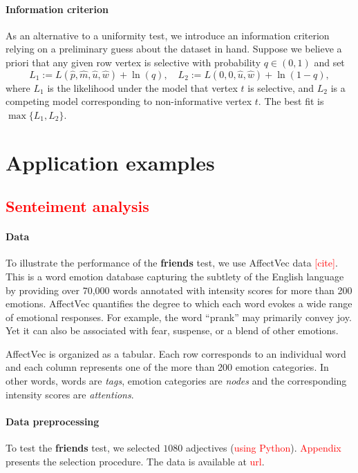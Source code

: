 \documentclass{llncs}
\newcommand{\red}[1]{\textcolor{red}{#1}}
\begin{document}
\paragraph{Information criterion}
As an alternative to a uniformity test, we introduce an information criterion relying on a preliminary guess about the dataset in hand. Suppose we believe a priori that any given row vertex is selective with probability $q\in (0, 1)$ and set
\[
L_1 := L(\hat{p}, \hat{m}, \hat{u}, \hat{w}) + \ln(q),
\quad
L_2 := L(0, 0, \hat{u}, \hat{w}) + \ln(1-q),
\]
where $L_1$ is the likelihood under the model that vertex $t$ is selective, and $L_2$ is a competing model corresponding to non-informative vertex $t$.
The best fit is $\max\{L_1, L_2\}$.

\section{Application examples}
\label{sec:experiments}
\subsection{\red{Senteiment analysis}}
\paragraph{Data} To illustrate the performance of the 
\textbf{friends} test, we use AffectVec data \red{[cite]}. This is a word emotion database capturing the subtlety of the English language by providing over 70,000 words annotated with intensity scores for more than 200 emotions. AffectVec quantifies the degree to which each word evokes a wide range of emotional responses. For example, the word ``prank'' may primarily convey joy. Yet it can also be associated with fear, suspense, or a blend of other emotions.

AffectVec is organized as a tabular. Each row corresponds to an individual word and each column represents one of the more than 200 emotion categories. In other words, words are \textit{tags}, emotion categories are \textit{nodes} and the corresponding intensity scores are \textit{attentions}. 

\paragraph{Data preprocessing} To test the \textbf{friends} test, we selected $1080$ adjectives (\red{using Python}). \red{Appendix} presents the selection procedure. The data is available at \red{url}.
\end{document}

